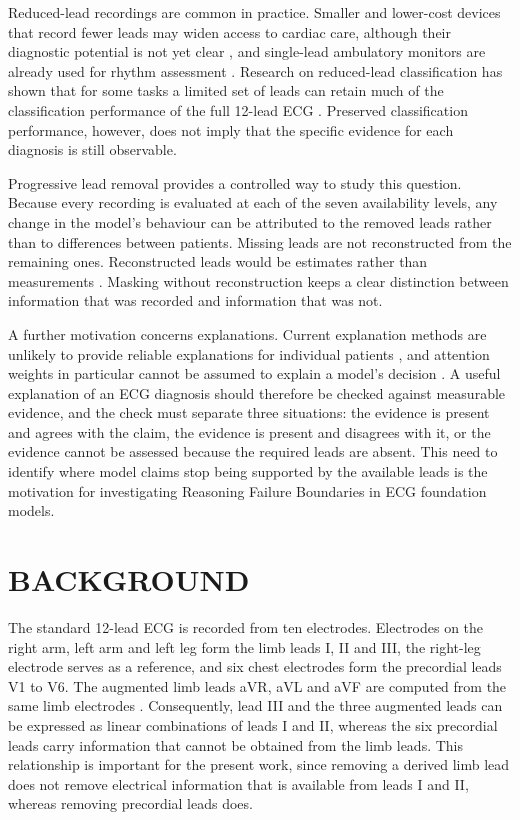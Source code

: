 Reduced-lead recordings are common in practice. Smaller and lower-cost devices that record fewer leads may widen access to cardiac care, although their diagnostic potential is not yet clear \cite{REYNA2022ISSUES}, and single-lead ambulatory monitors are already used for rhythm assessment \cite{HANNUN2019CARDIOLOGIST}. Research on reduced-lead classification has shown that for some tasks a limited set of leads can retain much of the classification performance of the full 12-lead ECG \cite{REYNA2022ISSUES,LAI2021LEADSELECTION}. Preserved classification performance, however, does not imply that the specific evidence for each diagnosis is still observable.

Progressive lead removal provides a controlled way to study this question. Because every recording is evaluated at each of the seven availability levels, any change in the model's behaviour can be attributed to the removed leads rather than to differences between patients. Missing leads are not reconstructed from the remaining ones. Reconstructed leads would be estimates rather than measurements \cite{PRESACAN2025RECON}. Masking without reconstruction keeps a clear distinction between information that was recorded and information that was not.

A further motivation concerns explanations. Current explanation methods are unlikely to provide reliable explanations for individual patients \cite{GHASSEMI2021FALSEHOPE}, and attention weights in particular cannot be assumed to explain a model's decision \cite{JAIN2019ATTENTION}. A useful explanation of an ECG diagnosis should therefore be checked against measurable evidence, and the check must separate three situations: the evidence is present and agrees with the claim, the evidence is present and disagrees with it, or the evidence cannot be assessed because the required leads are absent. This need to identify where model claims stop being supported by the available leads is the motivation for investigating Reasoning Failure Boundaries in ECG foundation models.

\section{BACKGROUND}
The standard 12-lead ECG is recorded from ten electrodes. Electrodes on the right arm, left arm and left leg form the limb leads I, II and III, the right-leg electrode serves as a reference, and six chest electrodes form the precordial leads V1 to V6. The augmented limb leads aVR, aVL and aVF are computed from the same limb electrodes \cite{KLIGFIELD2007AHA}. Consequently, lead III and the three augmented leads can be expressed as linear combinations of leads I and II, whereas the six precordial leads carry information that cannot be obtained from the limb leads. This relationship is important for the present work, since removing a derived limb lead does not remove electrical information that is available from leads I and II, whereas removing precordial leads does.

